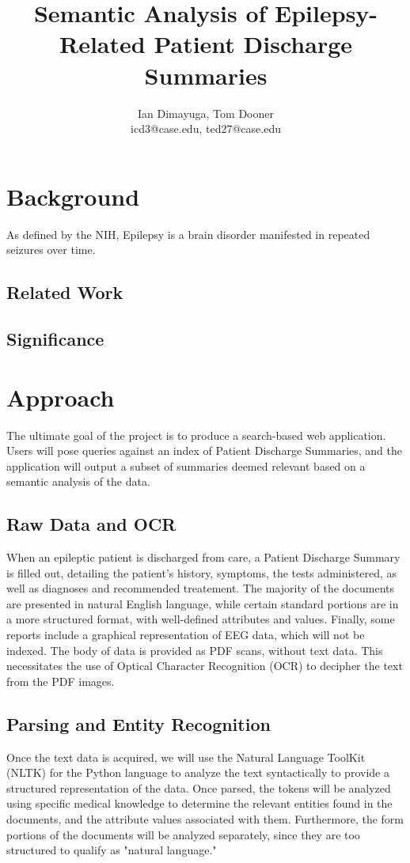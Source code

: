 \documentclass[12pt]{article}
\title{Semantic Analysis of Epilepsy-Related Patient Discharge Summaries}
\author{Ian Dimayuga, Tom Dooner \\icd3@case.edu, ted27@case.edu}
\begin{document}
\maketitle

\section{Background}
As defined by the NIH, Epilepsy is a brain disorder manifested in repeated seizures
over time.~\cite{nih-epilepsy}

\subsection{Related Work}

\subsection{Significance}

\section{Approach}
The ultimate goal of the project is to produce a search-based web application.
Users will pose queries against an index of Patient Discharge Summaries, and the
application will output a subset of summaries deemed relevant based on a semantic
analysis of the data.

\subsection{Raw Data and OCR}
When an epileptic patient is discharged from care, a Patient Discharge Summary is
filled out, detailing the patient's history, symptoms, the tests administered, as
well as diagnoses and recommended treatement. The majority of the documents are
presented in natural English language, while certain standard portions are in a
more structured format, with well-defined attributes and values. Finally, some
reports include a graphical representation of EEG data, which will not be indexed.
The body of data is provided as PDF scans, without text data. This necessitates the use
of Optical Character Recognition (OCR) to decipher the text from the PDF images.

\subsection{Parsing and Entity Recognition}
Once the text data is acquired, we will use the Natural Language ToolKit (NLTK)
for the Python language to analyze the text syntactically to provide a structured
representation of the data. Once parsed, the tokens will be analyzed using specific
medical knowledge to determine the relevant entities found in the documents, and the
attribute values associated with them. Furthermore, the form portions of the documents
will be analyzed separately, since they are too structured to qualify as "natural
language."
\end{document}
